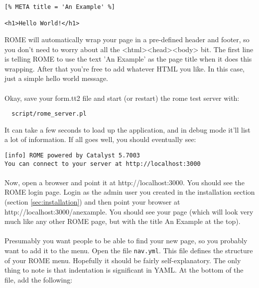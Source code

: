 \begin{verbatim}
[% META title = 'An Example' %]

<h1>Hello World!</h1>
\end{verbatim}

ROME will automatically wrap your page in a pre-defined header and footer, so you don't need to worry about all the <html><head><body> bit. The first line is telling ROME to use the text 'An Example' as the page title when it does this wrapping. After that you're free to add whatever HTML you like. In this case, just a simple hello world message.

\paragraph*{}
Okay, save your form.tt2 file and start (or restart) the rome test server with:

\begin{verbatim}
  script/rome_server.pl
\end{verbatim}

It can take a few seconds to load up the application, and in debug mode it'll list a lot of information. If all goes well, you should eventually see:

\begin{verbatim}
[info] ROME powered by Catalyst 5.7003
You can connect to your server at http://localhost:3000
\end{verbatim}

\paragraph*{}
Now, open a browser and point it at http://localhost:3000. You should see the ROME login page. Login as the admin user you created in the installation section (section \ref{sec:installation}) and then point your browser at http://localhost:3000/anexample. You should see your page (which will look very much like any other ROME page, but with the title An Example at the top).

\paragraph*{}
Presumably you want people to be able to find your new page, so you probably want to add it to the menu. Open the file \verb|nav.yml|. This file defines the structure of your ROME menu. Hopefully it should be fairly self-explanatory. The only thing to note is that indentation is significant in YAML. At the bottom of the file, add the following:

